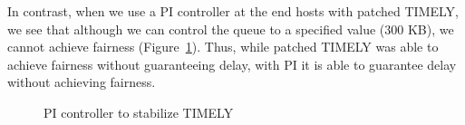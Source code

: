 In contrast, when we use a PI controller at the end hosts with patched
TIMELY, we see that although we can control the queue
to a specified value (300 KB), we cannot achieve fairness (Figure~\ref{fig:timely_pi}). 
Thus, while patched TIMELY was able to achieve fairness without guaranteeing
delay, with PI it is able to guarantee delay without
achieving fairness.
\begin{figure}
\center
{}
\vspace{-1em}
\caption{PI controller to stabilize TIMELY}
\vspace{-1em}
\label{fig:timely_pi}
\end{figure}


